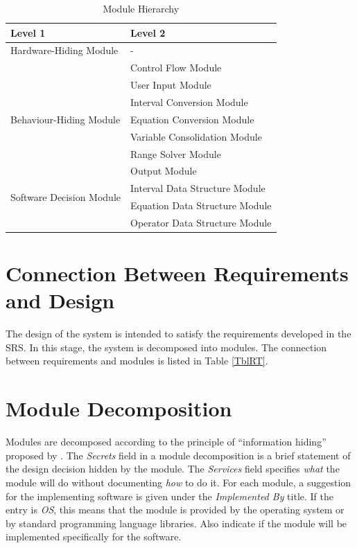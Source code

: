 \documentclass[12pt, titlepage]{article}
\begin{document}
\begin{table}[h!]
\centering
\begin{tabular}{p{} p{}}
\toprule
\textbf{Level 1} & \textbf{Level 2}\\
\midrule

{Hardware-Hiding Module} & - \\
\midrule

\multirow{7}{0.29\textwidth}{Behaviour-Hiding Module} & Control Flow Module \\
& User Input Module \\
& Interval Conversion Module \\
& Equation Conversion Module \\
& Variable Consolidation Module \\
& Range Solver Module \\
& Output Module \\
\midrule

\multirow{2}{0.29\textwidth}{Software Decision Module} & Interval Data 
Structure Module \\
& Equation Data Structure Module \\
& Operator Data Structure Module \\
\bottomrule

\end{tabular}
\caption{Module Hierarchy}
\label{TblMH}
\end{table}

\newpage

\section{Connection Between Requirements and Design} 
\label{SecConnection}
The design of the system is intended to satisfy the requirements developed in
the SRS. In this stage, the system is decomposed into modules. The connection
between requirements and modules is listed in Table \ref{TblRT}.

\newpage

\section{Module Decomposition} 
\label{SecMD}
Modules are decomposed according to the principle of ``information hiding''
proposed by \citet{ParnasEtAl1984}. The \emph{Secrets} field in a module
decomposition is a brief statement of the design decision hidden by the
module. The \emph{Services} field specifies \emph{what} the module will do
without documenting \emph{how} to do it. For each module, a suggestion for the
implementing software is given under the \emph{Implemented By} title. If the
entry is \emph{OS}, this means that the module is provided by the operating
system or by standard programming language libraries.  Also indicate if the
module will be implemented specifically for the software.
\end{document}
